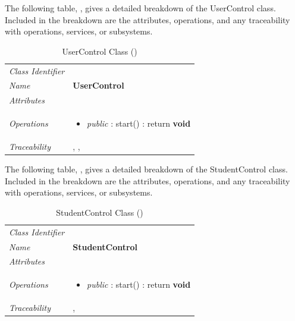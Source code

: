 \documentclass[12pt,letterpaper]{article}
\begin{document}
The following table, , gives a detailed breakdown of the UserControl class. Included in the breakdown are the attributes, operations, and any traceability with operations, services, or subsystems.

\begin{table}[H]
    \caption{UserControl Class ()} 
	\begin{tabu} to 
		\toprule
		Class Identifier &  \\
		Name & {\bf UserControl} \\
		Attributes &\\

		Operations &
		\begin{minipage}[t]{\linewidth}
			\begin{itemize}
			    \item {\it public} : start() : return {\bf void}
	        \end{itemize}
	    \end{minipage} \\
	    	Traceability & , , \\
		\toprule
	\end{tabu}
\end{table}

The following table, , gives a detailed breakdown of the StudentControl class. Included in the breakdown are the attributes, operations, and any traceability with operations, services, or subsystems.

\begin{table}[H]
    \caption{StudentControl Class ()} 
	\begin{tabu} to 
		\toprule
		Class Identifier &  \\
		Name & {\bf StudentControl} \\
		Attributes & \\

		Operations &
		\begin{minipage}[t]{\linewidth}
			\begin{itemize}
			    \item {\it public} : start() : return {\bf void}
	        \end{itemize}
	    \end{minipage} \\
	    	Traceability & , \\
		\toprule
	\end{tabu}
\end{table}
\end{document}
